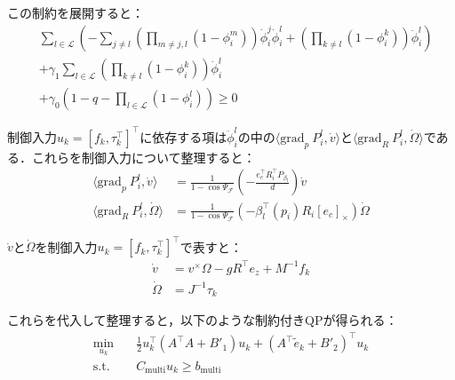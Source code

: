 この制約を展開すると：
\begin{equation}
\begin{aligned}
&\sum_{l \in \mathcal{L}} \left(-\sum_{j \neq l} \left(\prod_{m \neq j, l} (1 - \phi_i^m)\right) \dot{\phi}_i^j \dot{\phi}_i^l + \left(\prod_{k \neq l} (1 - \phi_i^k)\right) \ddot{\phi}_i^l\right) \\
&+ \gamma_1 \sum_{l \in \mathcal{L}} \left(\prod_{k \neq l} (1 - \phi_i^k)\right) \dot{\phi}_i^l \\
&+ \gamma_0 (1 - q - \prod_{l \in \mathcal{L}} (1 - \phi_i^l)) \geq 0
\label{eq:multi_hocbf_constraint_expanded}
\end{aligned}
\end{equation}

制御入力$u_k = [f_k, \tau_k^\top]^\top$に依存する項は$\ddot{\phi}_i^l$の中の$\langle \mathrm{grad}_p\:P_i^l, \dot{v} \rangle$と$\langle \mathrm{grad}_R\:P_i^l, \dot{\Omega} \rangle$である．これらを制御入力について整理すると：
\begin{equation}
\begin{aligned}
\langle \mathrm{grad}_p\:P_i^l, \dot{v} \rangle &= \frac{1}{1 - \cos\Psi_{\mathcal{F}}} \left(-\frac{e_c^\top R_i^\top P_{\beta_l}}{d}\right) \dot{v} \\
\langle \mathrm{grad}_R\:P_i^l, \dot{\Omega} \rangle &= \frac{1}{1 - \cos\Psi_{\mathcal{F}}} (-\beta_l^\top(p_i) R_i [e_c]_\times) \dot{\Omega}
\label{eq:multi_grad_input}
\end{aligned}
\end{equation}

$\dot{v}$と$\dot{\Omega}$を制御入力$u_k = [f_k, \tau_k^\top]^\top$で表すと：
\begin{equation}
\begin{aligned}
\dot{v} &= v^\times \Omega - g R^\top e_z + M^{-1} f_k \\
\dot{\Omega} &= J^{-1} \tau_k
\label{eq:multi_acceleration}
\end{aligned}
\end{equation}

これらを代入して整理すると，以下のような制約付きQPが得られる：
\begin{equation}
\begin{aligned}
\min_{u_k} \quad & \frac{1}{2} u_k^\top (A^\top A + B'_1) u_k + (A^\top \tilde{e}_k + B'_2)^\top u_k \\
\mathrm{s.t.} \quad & C_{\mathrm{multi}} u_k \geq b_{\mathrm{multi}}
\label{eq:multi_hocbf_qp}
\end{aligned}
\end{equation}

